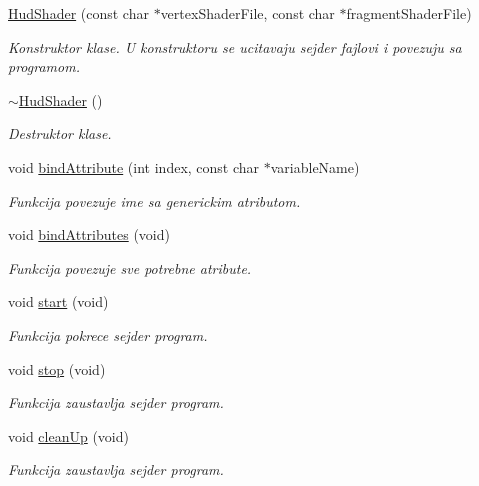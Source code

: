 \begin{DoxyCompactItemize}
\item 
\hyperlink{classshader_1_1HudShader_a0eaa23fb174467b4006da9de33a9f3a0}{Hud\+Shader} (const char $\ast$vertex\+Shader\+File, const char $\ast$fragment\+Shader\+File)
\begin{DoxyCompactList}\small\item\em Konstruktor klase. U konstruktoru se ucitavaju sejder fajlovi i povezuju sa programom. \end{DoxyCompactList}\item 
\hyperlink{classshader_1_1HudShader_a40b9a50318827b37e1eeac09545b7727}{$\sim$\+Hud\+Shader} ()
\begin{DoxyCompactList}\small\item\em Destruktor klase. \end{DoxyCompactList}\item 
void \hyperlink{classshader_1_1HudShader_acb1e2f4627e7ca8b1ad7510ecc0e1365}{bind\+Attribute} (int index, const char $\ast$variable\+Name)
\begin{DoxyCompactList}\small\item\em Funkcija povezuje ime sa generickim atributom. \end{DoxyCompactList}\item 
void \hyperlink{classshader_1_1HudShader_a56b7babc788d444c185cd702f97a324c}{bind\+Attributes} (void)
\begin{DoxyCompactList}\small\item\em Funkcija povezuje sve potrebne atribute. \end{DoxyCompactList}\item 
void \hyperlink{classshader_1_1HudShader_a5c77dcdc917ba6890d210ae028cd0eba}{start} (void)
\begin{DoxyCompactList}\small\item\em Funkcija pokrece sejder program. \end{DoxyCompactList}\item 
void \hyperlink{classshader_1_1HudShader_ac6abdbd414b55257314aeddf68e54384}{stop} (void)
\begin{DoxyCompactList}\small\item\em Funkcija zaustavlja sejder program. \end{DoxyCompactList}\item 
void \hyperlink{classshader_1_1HudShader_a944a6532286b6071b53d97eee8980713}{clean\+Up} (void)
\begin{DoxyCompactList}\small\item\em Funkcija zaustavlja sejder program. \end{DoxyCompactList}\item 

\end{DoxyCompactItemize}
